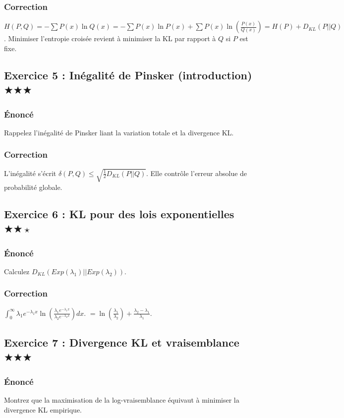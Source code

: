 \documentclass[11pt,a4paper]{article}
\begin{document}
\subsubsection*{Correction}
$H(P, Q) = -\sum P(x) \ln Q(x) = -\sum P(x) \ln P(x) + \sum P(x) \ln\left(\frac{P(x)}{Q(x)}\right) = H(P) + D_{KL}(P||Q)$.
Minimiser l'entropie croisée revient à minimiser la KL par rapport à $Q$ si $P$ est fixe.

\subsection*{Exercice 5 : Inégalité de Pinsker (introduction) \quad $\bigstar\bigstar\bigstar$}
\subsubsection*{Énoncé}
Rappelez l'inégalité de Pinsker liant la variation totale et la divergence KL.
\subsubsection*{Correction}
L'inégalité s'écrit $\delta(P, Q) \le \sqrt{\frac{1}{2} D_{KL}(P||Q)}$. Elle contrôle l'erreur absolue de probabilité globale.

\subsection*{Exercice 6 : KL pour des lois exponentielles \quad $\bigstar\bigstar\star$}
\subsubsection*{Énoncé}
Calculez $D_{KL}(Exp(\lambda_1) || Exp(\lambda_2))$.
\subsubsection*{Correction}
$\int_0^\infty \lambda_1 e^{-\lambda_1 x} \ln\left(\frac{\lambda_1 e^{-\lambda_1 x}}{\lambda_2 e^{-\lambda_2 x}}\right) dx$.
$= \ln(\frac{\lambda_1}{\lambda_2}) + \frac{\lambda_2 - \lambda_1}{\lambda_1}$.

\subsection*{Exercice 7 : Divergence KL et vraisemblance \quad $\bigstar\bigstar\bigstar$}
\subsubsection*{Énoncé}
Montrez que la maximisation de la log-vraisemblance équivaut à minimiser la divergence KL empirique.
\end{document}
